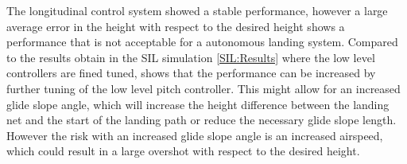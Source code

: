 



The longitudinal control system showed a stable performance, however a large average error in the height with respect to the desired height shows a performance that is not acceptable for a autonomous landing system. Compared to the results obtain in the SIL simulation \ref{SIL:Results} where the low level controllers are fined tuned, shows that the performance can be increased by further tuning of the low level pitch controller. This might allow for an increased glide slope angle, which will increase the height difference between the landing net and the start of the landing path or reduce the necessary glide slope length. However the risk with an increased glide slope angle is an increased airspeed, which could result in a large overshot with respect to the desired height. 

